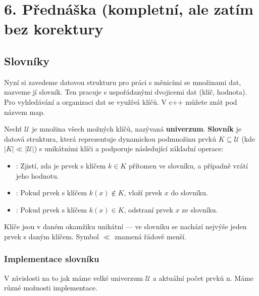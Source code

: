 
\section{6. Přednáška (kompletní, ale zatím bez korektury}

\subsection{Slovníky}

Nyní si zavedeme datovou strukturu pro práci s měnicími se množinami dat, nazveme jí slovník. Ten pracuje s uspořádanými dvojicemi dat (klíč, hodnota). Pro vyhledávání a organizaci dat se využívá klíčů. V c++ můžete znát pod názvem map.

\bigskip

\begin{definition}[Slovník]
Nechť $\mathcal{U}$ je množina všech možných klíčů, nazývaná \textbf{univerzum}. \textbf{Slovník} je datová struktura, která reprezentuje dynamickou podmnožinu prvků $K \subseteq \mathcal{U}$ (kde $|K| \ll |\mathcal{U}|$) s unikátními klíči a podporuje následující základní operace:
\begin{itemize}[itemsep=-0.15em]
    \item {}: Zjistí, zda je prvek s klíčem $k \in K$ přítomen ve slovníku, a případně vrátí jeho hodnotu.
    \item {}: Pokud prvek s klíčem $k(x) \notin K$, vloží prvek $x$ do slovníku.
    \item {}: Pokud prvek s klíčem $k(x) \in K$, odstraní prvek $x$ ze slovníku.
\end{itemize}
\end{definition}

\begin{remark}
Klíče jsou v daném okamžiku unikátní — ve slovníku se nachází nejvýše jeden prvek s daným klíčem. Symbol $\ll$ znamená řádově menší.
\end{remark}

\bigskip

\subsubsection{Implementace slovníku}

V závislosti na to jak máme velké univerzum $\mathcal{U}$ a aktuální počet prvků n. Máme různé možnosti implementace.

